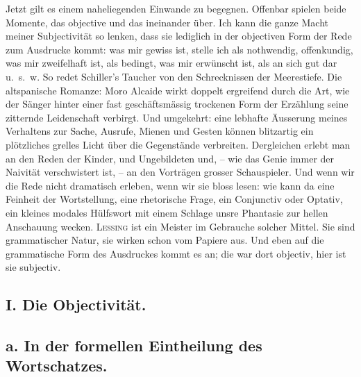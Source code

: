 \largerpage[-1]
Jetzt gilt es einem naheliegenden Einwande zu begegnen. Offenbar spielen beide Momente, das objective und das   ineinander über. Ich kann die ganze Macht meiner Subjectivität so lenken, dass sie lediglich in der objectiven Form der Rede zum Ausdrucke kommt: was mir gewiss ist, stelle ich als nothwendig, offenkundig, was mir zweifelhaft ist, als bedingt, was mir erwünscht ist, als an sich gut dar u.~s.~w. So redet Schiller’s Taucher von den Schrecknissen der Meerestiefe. Die altspanische Romanze: Moro Alcaide wirkt doppelt ergreifend durch die Art, wie der Sänger hinter einer fast geschäftsmässig trockenen Form der Erzählung seine zitternde Leidenschaft verbirgt. Und umgekehrt: eine lebhafte Äusserung meines Verhaltens zur Sache, Ausrufe, Mienen und Gesten können blitzartig ein plötzliches grelles Licht über die Gegenstände verbreiten. Dergleichen erlebt man an den Reden der Kinder, und Ungebildeten und, – wie das Genie immer der Naivität verschwistert ist, – an den Vorträgen grosser Schauspieler. Und wenn wir die Rede nicht dramatisch erleben, wenn wir sie bloss \label{fp.418} lesen: wie kann da eine Feinheit der Wortstellung, eine rhetorische Frage, ein Conjunctiv oder Optativ, ein kleines modales Hülfswort mit einem Schlage unsre Phantasie zur hellen Anschauung wecken. \textsc{Lessing} ist ein Meister im Gebrauche solcher Mittel. Sie sind grammatischer Natur, sie wirken schon vom Papiere aus. Und eben auf die grammatische Form des Ausdruckes kommt es an; die war dort objectiv, hier ist sie subjectiv.

\subsection*{I. Die Objectivität.}\label{IV.IV.Ia}
\subsection*{a. In der formellen Eintheilung des Wortschatzes.}

